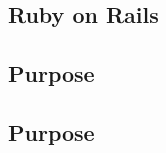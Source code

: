 \subsection{Ruby on Rails}
\label{sect:framework:ror}


\subsection{Purpose}
\label{sect:framwork:advantages}


\subsection{Purpose}
\label{sect:framwork:disadvantages}
